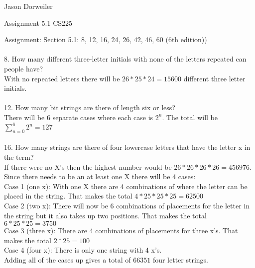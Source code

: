 \documentclass[12]{article}
\begin{document}
Jason Dorweiler

Assignment 5.1 CS225

Assignment: Section 5.1: 8, 12, 16, 24, 26, 42, 46, 60 (6th edition))\\

\hrulefill\\

8. How many different three-letter initials with none of the letters repeated can people have?\\

With no repeated letters there will be $26*25*24 = 15600$ different three letter initials. \\

\hrulefill\\

12. How many bit strings are there of length six or less?\\

There will be 6 separate cases where each case is $2^{n}$. The total will be $\displaystyle{\sum_{n=0}^{6} 2^n} = 127$\\

\hrulefill\\

16. How many strings are there of four lowercase letters that have the letter
x
in the term? \\

If there were no X's then the highest number would be $26*26*26*26 = 456976$.  Since there needs to be an at least one X there will be 4 cases:\\

Case 1 (one x): With one X there are 4 combinations of where the letter can be placed in the string.  That makes the total $4*25*25*25 = 62500$\\

Case 2 (two x): There will now be 6 combinations of placements for the letter in the string but it also takes up two positions.  That makes the total $6*25*25 = 3750$\\

Case 3 (three x): There are 4 combinations of placements for three x's.  That makes the total $2*25 = 100$\\

Case 4 (four x): There is only one string with 4 x's.\\

Adding all of the cases up gives a total of $66351$ four letter strings. \\
\end{document}
